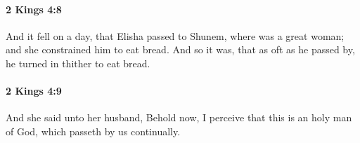 		\paragraph{2 Kings 4:8} %
			\label{2KINGS-4-8}

			And it fell on a day, that Elisha passed to Shunem, where was a great woman; and she constrained him to eat bread. And so it was, that as oft as he passed by, he turned in thither to eat bread.


		\paragraph{2 Kings 4:9} %
			\label{2KINGS-4-9}

			And she said unto her husband, Behold now, I perceive that this is an holy man of God, which passeth by us continually.



